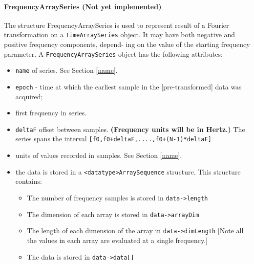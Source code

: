 \documentclass[]{ligodcc}
\renewcommand{\texttt}[1]{{\ttfamily\color{blue}#1}}
\begin{document}
\paragraph{{\texttt {FrequencyArraySeries}} {\bf (Not yet implemented)} \\}

The structure FrequencyArraySeries is used to represent result of a
Fourier transformation on a {\tt TimeArraySeries} object. It may have both
negative and positive frequency components, depend- ing on the value
of the starting frequency parameter. A {\tt FrequencyArraySeries} object has
the following attributes:


\begin{itemize}
\vspace{-0.15in}
\item
{\tt name} of series. See Section \ref{name}.
\vspace{-0.15in}
\item
{\tt epoch}  -  time at which the earliest sample in the [pre-transformed]
data was acquired;
\vspace{-0.15in}
\item
first frequency in series. 
\vspace{-0.15in}
\item
{\tt deltaF} offset between samples.  {\bf (Frequency units will be in Hertz.)}
The series spans the interval {\tt [f0,f0+deltaF,....,f0+(N-1)*deltaF]}
\vspace{-0.15in}
\item
units of values recorded in samples. See Section \ref{name}.
\vspace{-0.15in}
\item
the data is stored in a {\tt <datatype>ArraySequence}  structure. This
structure contains:
\begin{itemize}
\vspace{-0.1in}
\item
The number of frequency  samples is stored in {\tt data->length}
\vspace{-0.1in}
\item
The dimension of each array is stored in {\tt data->arrayDim}
\vspace{-0.1in}
\item
The length of each dimension of the array in {\tt data->dimLength}
[Note all the values in each array are evaluated at a single frequency.]
\vspace{-0.1in}
\item
The data is stored in {\tt data->data[]}
\end{itemize}
\end{itemize}
\end{document}
